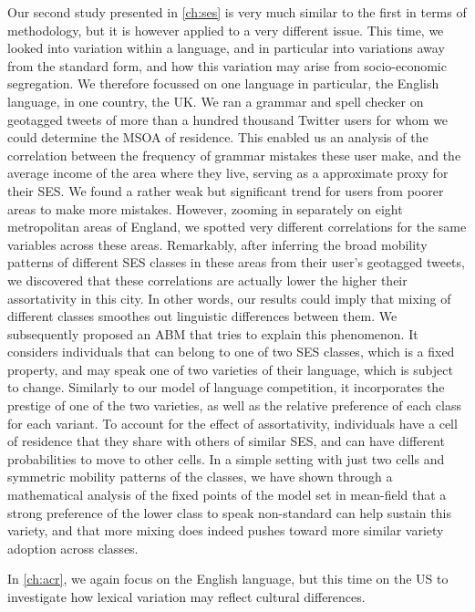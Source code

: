 \documentclass[../thesis.tex]{subfiles}
\begin{document}
Our second study presented in \cref{ch:ses} is very much similar to the first in terms
of methodology, but it is however applied to a very different issue. This time, we
looked into variation within a language, and in particular into variations away from the
standard form, and how this variation may arise from socio-economic segregation. We
therefore focussed on one language in particular, the English language, in one country,
the UK. We ran a grammar and spell checker on geotagged tweets of more than a hundred
thousand Twitter users for whom we could determine the \ac{MSOA} of residence. This
enabled us an analysis of the correlation between the frequency of grammar mistakes
these user make, and the average income of the area where they live, serving as a
approximate proxy for their \ac{SES}. We found a rather weak but significant trend for
users from poorer areas to make more mistakes. However, zooming in separately on eight
metropolitan areas of England, we spotted very different correlations for the same
variables across these areas. Remarkably, after inferring the broad mobility patterns of
different \ac{SES} classes in these areas from their user's geotagged tweets, we
discovered that these correlations are actually lower the higher their assortativity in
this city. In other words, our results could imply that mixing of different classes
smoothes out linguistic differences between them. We subsequently proposed an \ac{ABM}
that tries to explain this phenomenon. It considers individuals that can belong to one
of two \ac{SES} classes, which is a fixed property, and may speak one of two varieties
of their language, which is subject to change. Similarly to our model of language
competition, it incorporates the prestige of one of the two varieties, as well as the
relative preference of each class for each variant. To account for the effect of
assortativity, individuals have a cell of residence that they share with others of
similar \ac{SES}, and can have different probabilities to move to other cells. In a
simple setting with just two cells and symmetric mobility patterns of the classes, we
have shown through a mathematical analysis of the fixed points of the model set in
mean-field that a strong preference of the lower class to speak non-standard can help
sustain this variety, and that more mixing does indeed pushes toward more similar
variety adoption across classes.

In \cref{ch:acr}, we again focus on the English language, but this time on the US to
investigate how lexical variation may reflect cultural differences. 
\end{document}
